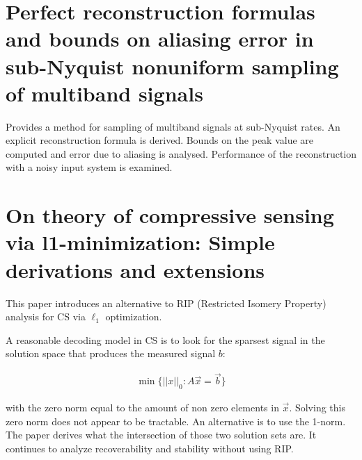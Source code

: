 \documentclass[report, oneside, a4paper, openany]{memoir}
\begin{document}
\section{Perfect reconstruction formulas and bounds on aliasing error in sub-Nyquist nonuniform sampling of multiband signals \cite{venkataramani2000perfect}}
Provides a method for sampling of multiband signals at sub-Nyquist rates. An explicit reconstruction formula is derived.
Bounds on the peak value are computed and error due to aliasing is analysed.
Performance of the reconstruction with a noisy input system is examined.
\section{On theory of compressive sensing via l1-minimization: Simple derivations and extensions \cite{zhang2008theory}}
This paper introduces an alternative to RIP (Restricted Isomery Property) analysis for CS via $\ell_1$ optimization. 


	

A reasonable decoding model in CS is to look for the sparsest signal
in the solution space that produces the measured signal $b$:

\begin{align*}
	\min \{ ||x||_0 : A\vec{x} = \vec{b} \}
\end{align*} 

\noindent with the zero norm equal to the amount of non zero elements in $\vec{x}$. Solving this zero norm does not appear to be tractable. An alternative is to use the 1-norm. The paper derives what the intersection of those two solution sets are. It continues to analyze recoverability and stability without using RIP.
\end{document}
